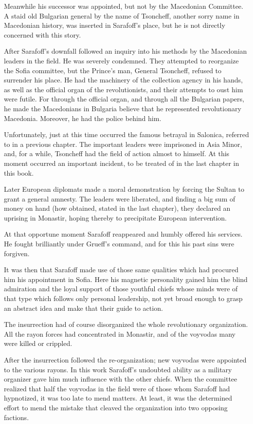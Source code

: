 \documentclass[a5paper,12pt]{book}
\begin{document}
Meanwhile his successor was appointed, but not by the Macedonian Committee. A staid old Bulgarian general by the name of Tsoncheff, another sorry name in Macedonian history, was inserted in Sarafoff’s place, but he is not directly concerned with this story.

After Sarafoff’s downfall followed an inquiry into his methods by the Macedonian leaders in the field. He was severely condemned. They attempted to reorganize the Sofia committee, but the Prince’s man, General Tsoncheff, refused to surrender his place. He had the machinery of the collection agency in his hands, as well as the official organ of the revolutionists, and their attempts to oust him were futile. For through the official organ, and through all the Bulgarian papers, he made the Macedonians in Bulgaria believe that he represented revolutionary Macedonia. Moreover, he had the police behind him.

Unfortunately, just at this time occurred the famous betrayal in Salonica, referred to in a previous chapter. The important leaders were imprisoned in Asia Minor, and, for a while, Tsoncheff had the field of action almost to himself. At this moment occurred an important incident, to be treated of in the last chapter in this book.

Later European diplomats made a moral demonstration by forcing the Sultan to grant a general amnesty. The leaders were liberated, and finding a big sum of money on hand (how obtained, stated in the last chapter), they declared an uprising in Monastir, hoping thereby to precipitate European intervention.

At that opportune moment Sarafoff reappeared and humbly offered his services. He fought brilliantly under Grueff’s command, and for this his past sins were forgiven.

It was then that Sarafoff made use of those same qualities which had procured him his appointment in Sofia. Here his magnetic personality gained him the blind admiration and the loyal support of those youthful chiefs whose minds were of that type which follows only personal leadership, not yet broad enough to grasp an abstract idea and make that their guide to action.

The insurrection had of course disorganized the whole revolutionary organization. All the rayon forces had concentrated in Monastir, and of the voyvodas many were killed or crippled.

After the insurrection followed the re-organization; new voyvodas were appointed to the various rayons. In this work Sarafoff's undoubted ability as a military organizer gave him much influence with the other chiefs. When the committee realized that half the voyvodas in the field were of those whom Sarafoff had hypnotized, it was too late to mend matters. At least, it was the determined effort to mend the mistake that cleaved the organization into two opposing factions.
\end{document}
